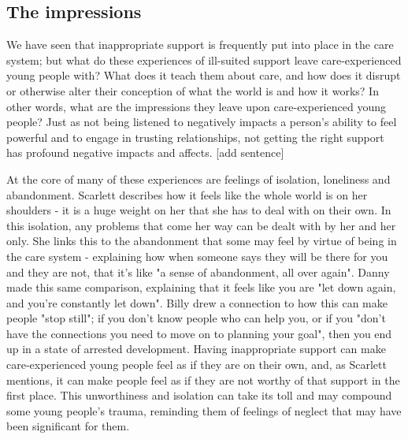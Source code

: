 \subsection{The impressions}
We have seen that inappropriate support is frequently put into place in the care system; but what do these experiences of ill-suited support leave care-experienced young people with? What does it teach them about care, and how does it disrupt or otherwise alter their conception of what the world is and how it works? In other words, what are the impressions they leave upon care-experienced young people? Just as not being listened to negatively impacts a person's ability to feel powerful and to engage in trusting relationships, not getting the right support has profound negative impacts and affects. [add sentence]

At the core of many of these experiences are feelings of isolation, loneliness and abandonment. Scarlett describes how it feels like the whole world is on her shoulders - it is a huge weight on her that she has to deal with on their own. In this isolation, any problems that come her way can be dealt with by her and her only. She links this to the abandonment that some may feel by virtue of being in the care system - explaining how when someone says they will be there for you and they are not, that it's like "a sense of abandonment, all over again". Danny made this same comparison, explaining that it feels like you are "let down again, and you're constantly let down". Billy drew a connection to how this can make people "stop still"; if you don't know people who can help you, or if you "don't have the connections you need to move on to planning your goal", then you end up in a state of arrested development. Having inappropriate support can make care-experienced young people feel as if they are on their own, and, as Scarlett mentions, it can make people feel as if they are not worthy of that support in the first place. This unworthiness and isolation can take its toll and may compound some young people's trauma, reminding them of feelings of neglect that may have been significant for them.

